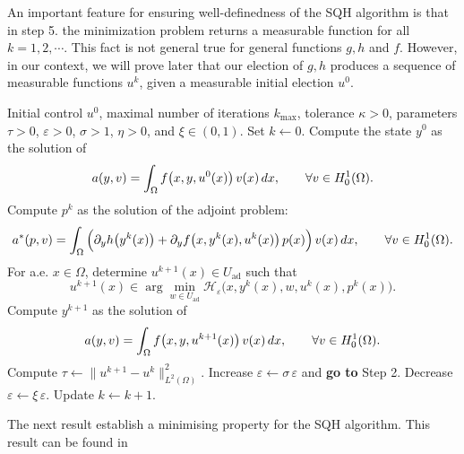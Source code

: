 An important feature for ensuring well-definedness of the SQH algorithm is that in step 5. the minimization problem returns a measurable function for all $k=1,2,\cdots$. This fact is not general true for general functions $g, h $ and $f$. However, in our context, we will prove later that our election of $g, h$ produces a sequence of measurable functions $u^k$, given a measurable initial election $u^0$. 

\begin{algorithm}
\caption{Sequential Quadratic Hamiltonian (SQH) method for elliptic optimal control problems}
\label{alg:sqh}
\begin{algorithmic}[1]
\Require Initial control $u^0$, maximal number of iterations $k_{\max}$, tolerance $\kappa>0$, parameters $\tau>0$, $\varepsilon>0$, $\sigma>1$, $\eta>0$, and $\xi\in(0,1)$.
\State Set $k\gets 0$.
\State Compute the state $y^0$ as the solution of 
\[
a(y,v)=\int_{\Omega} f\big(x,y,u^0(x)\big)\,v(x)\,dx,\qquad \forall v\in H_0^1(\Omega).
\]
    \State Compute $p^k$ as the solution of the adjoint problem:
    \[
    a^*(p,v)=\int_{\Omega}\Big(\partial_y h\big(y^k(x)\big)
    +\partial_y f\big(x,y^k(x),u^k(x)\big)\,p(x)\Big)\,v(x)\,dx,
    \qquad \forall v\in H_0^1(\Omega).
    \]
    \State For a.e. $x\in\Omega$, determine $u^{k+1}(x)\in U_{\mathrm{ad}}$ such that
    \[
    u^{k+1}(x)\in\arg\min_{w\in U_{\mathrm{ad}}} \mathcal{H}_{\varepsilon}\big(x,y^k(x),w,u^k(x),p^k(x)\big).
    \]
    \State  Compute $y^{k+1}$ as the solution of
    \[
    a(y,v)=\int_{\Omega} f\big(x,y,u^{k+1}(x)\big)\,v(x)\,dx,\qquad \forall v\in H_0^1(\Omega).
    \]
    \State Compute $\tau \gets \|u^{k+1}-u^k\|_{L^2(\Omega)}^2$.  
        \State Increase $\varepsilon \gets \sigma\,\varepsilon$ and \textbf{go to} Step 2.
        \State Decrease $\varepsilon \gets \xi\,\varepsilon$.
    \EndIf
    \State Update $k\gets k+1$.
\EndWhile
\end{algorithmic}
\end{algorithm}
The next result establish a minimising property for the SQH algorithm. This result can be found in \cite[Theorem 7.3]{borzi2023}

